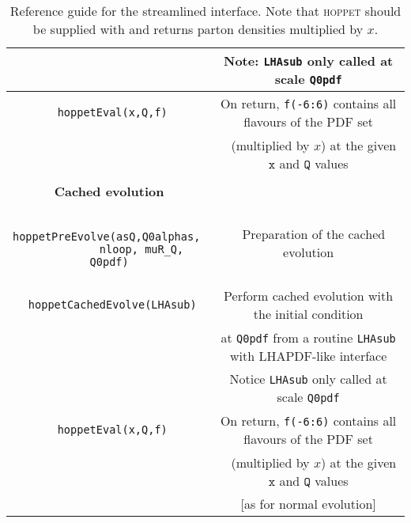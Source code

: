 \documentclass[12pt]{article}
\newcommand{\hoppet}{\textsc{hoppet}\xspace}
\newcommand{\ttt}[1]{\texttt{#1}}
\newcommand{\fn}{\scriptsize}
\begin{document}
\begin{table}
\begin{center}
\begin{tabular}{|c|c|}
&  \fn Note:  \ttt{LHAsub} only called at scale \ttt{Q0pdf}\\
\hline
\begin{lstlisting}
 hoppetEval(x,Q,f)
\end{lstlisting} &
\fn On return, \ttt{f(-6:6)} contains all flavours of the PDF set\\ 
& \fn ~
(multiplied by $x$) at the given $\ttt{x}$ and $\ttt{Q}$ values \\
\hline&\\[-0.5em]
\bf Cached evolution & \\
\hline
\begin{lstlisting}
 hoppetPreEvolve(asQ,Q0alphas, 
          nloop, muR_Q, Q0pdf)
\end{lstlisting} & \fn ~
 Preparation of the cached evolution\\
\hline
\begin{lstlisting}
 hoppetCachedEvolve(LHAsub)
\end{lstlisting} &
\fn  Perform cached evolution with the initial condition\\
& \fn at \ttt{Q0pdf} from a routine \ttt{LHAsub} 
with LHAPDF-like interface\\
&  \fn Notice  \ttt{LHAsub} only called at scale \ttt{Q0pdf}\\
\hline
\begin{lstlisting}
 hoppetEval(x,Q,f)
\end{lstlisting} &
\fn On return, \ttt{f(-6:6)} contains all flavours of the PDF set\\ 
& \fn ~
(multiplied by $x$) at the given $\ttt{x}$ and $\ttt{Q}$ values \\
& \fn [as for normal evolution]\\
\hline
\end{tabular}
\end{center}
\caption{\label{tab:streamlined} Reference guide for the streamlined
  interface. Note that \hoppet should be supplied with and returns parton
  densities multiplied by $x$.}
\end{table}




% 
% 
% 
\end{document}
